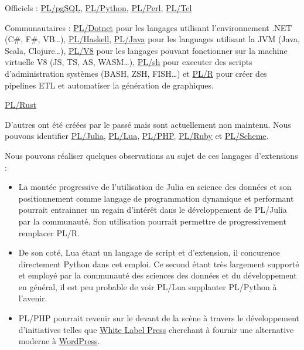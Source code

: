\documentclass[a4paper,12pt]{article}
\begin{document}
\begin{multicols*}{2}
Officiels : \href{https://www.postgresql.org/docs/current/plpgsql.html}{PL/pgSQL}, \href{https://www.postgresql.org/docs/current/plpython.html}{PL/Python}, \href{https://www.postgresql.org/docs/current/plperl.html}{PL/Perl}, \href{https://www.postgresql.org/docs/current/pltcl.html}{PL/Tcl}

Communautaires : \href{https://github.com/Brick-Abode/pldotnet/}{PL/Dotnet} pour les langages utilisant l'environnement .NET (C\#, F\#, VB\ldots{}), \href{https://github.com/ed-o-saurus/PLHaskell}{PL/Haskell}, \href{https://github.com/tada/pljava/}{PL/Java} pour les languages utilisant la JVM (Java, Scala, Clojure\ldots{}), \href{https://github.com/plv8/plv8}{PL/V8} pour les langages pouvant fonctionner sur la machine virtuelle V8 (JS, TS, AS, WASM\ldots{}), \href{https://github.com/petere/plsh}{PL/sh} pour executer des scripts d'administration systèmes (BASH, ZSH, FISH\ldots{}) et \href{https://github.com/postgres-plr/plr}{PL/R} pour créer des pipelines ETL et automatiser la génération de graphiques.

\href{https://github.com/tcdi/plrust/}{PL/Rust}

D'autres ont été créées par le passé mais sont actuellement non maintenu. Nous pouvons identifier \href{https://github.com/pljulia/pljulia}{PL/Julia}, \href{https://github.com/pllua/pllua-ng/}{PL/Lua}, \href{https://github.com/commandprompt/PL-php}{PL/PHP}, \href{https://github.com/knu/postgresql-plruby}{PL/Ruby} et \href{https://github.com/vy/plscheme}{PL/Scheme}.

Nous pouvons réaliser quelques observations au sujet de ces langages d'extensions :
\begin{itemize}
\item La montée progressive de l'utilisation de Julia en science des données et son positionnement comme langage de programmation dynamique et performant pourrait entrainner un regain d'intérêt dans le développement de PL/Julia par la communauté. Son utilisation pourrait permettre de progressivement remplacer PL/R.
\item De son coté, Lua étant un langage de script et d'extension, il concurence directement Python dans cet emploi. Ce second étant très largement supporté et employé par la communauté des sciences des données et du développement en général, il est peu probable de voir PL/Lua supplanter PL/Python à l'avenir.
\item PL/PHP pourrait revenir sur le devant de la scène à travers le développement d'initiatives telles que \href{https://github.com/wlp-builders/whitelabelpress-wlp}{White Label Press} cherchant à fournir une alternative moderne à \href{https://github.com/WordPress/WordPress}{WordPress}.


\end{itemize}
\end{multicols*}
\end{document}

